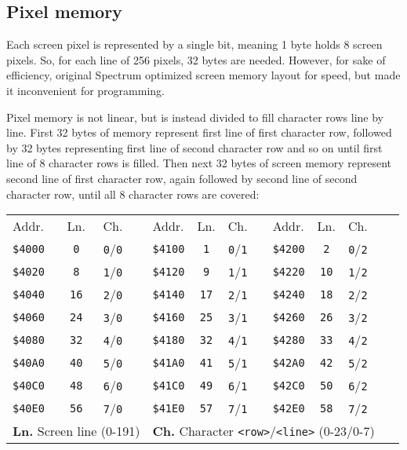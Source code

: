 \documentclass[12pt,twoside,openright,a4paper]{book}
\begin{document}
\subsection{Pixel memory}

Each screen pixel is represented by a single bit, meaning 1 byte holds 8 screen pixels. So, for each line of 256 pixels, 32 bytes are needed. However, for sake of efficiency, original Spectrum optimized screen memory layout for speed, but made it inconvenient for programming.

Pixel memory is not linear, but is instead divided to fill character rows line by line. First 32 bytes of memory represent first line of first character row, followed by 32 bytes representing first line of second character row and so on until first line of 8 character rows is filled. Then next 32 bytes of screen memory represent second line of first character row, again followed by second line of second character row, until all 8 character rows are covered:

{
	\newcommand{\PixelTitle}{Addr. & Ln. & Ch.}
	\newcommand{\PixelData}[4]{{\tt \$#1} & {\tt #2} & {\tt #3}/{\tt #4}}

	\begin{tabularx}{0.9\linewidth}{lccXlccXlcccX}
		\addtolength{\tabcolsep}{-2pt}
		\PixelTitle & & \PixelTitle & & \PixelTitle & & \\
		\PixelData{4000}{0}{0}{0} & & \PixelData{4100}{1}{0}{1} & & \PixelData{4200}{2}{0}{2} & & \multirow{8}{*}{\ddd} \\
		\PixelData{4020}{8}{1}{0} & & \PixelData{4120}{9}{1}{1} & & \PixelData{4220}{10}{1}{2} & & \\
		\PixelData{4040}{16}{2}{0} & & \PixelData{4140}{17}{2}{1} & & \PixelData{4240}{18}{2}{2} & & \\
		\PixelData{4060}{24}{3}{0} & & \PixelData{4160}{25}{3}{1} & & \PixelData{4260}{26}{3}{2} & & \\
		\PixelData{4080}{32}{4}{0} & & \PixelData{4180}{32}{4}{1} & & \PixelData{4280}{33}{4}{2} & & \\
		\PixelData{40A0}{40}{5}{0} & & \PixelData{41A0}{41}{5}{1} & & \PixelData{42A0}{42}{5}{2} & & \\
		\PixelData{40C0}{48}{6}{0} & & \PixelData{41C0}{49}{6}{1} & & \PixelData{42C0}{50}{6}{2} & & \\
		\PixelData{40E0}{56}{7}{0} & & \PixelData{41E0}{57}{7}{1} & & \PixelData{42E0}{58}{7}{2} & & \\[1ex]
		\multicolumn{4}{l}{\textbf{Ln.} Screen line (0-191)} & \multicolumn{9}{l}{\textbf{Ch.} Character {\tt <row>}/{\tt <line>} (0-23/0-7)} \\
	\end{tabularx}
}
\end{document}
